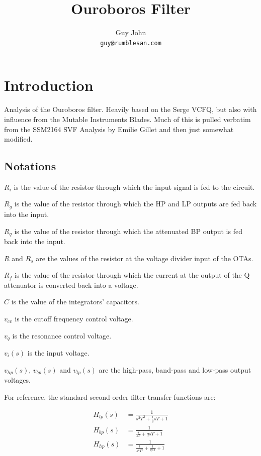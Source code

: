 \documentclass{article}
\title{Ouroboros Filter}
\author{Guy John \\ \texttt{guy@rumblesan.com}}
\begin{document}
\maketitle

\section{Introduction}
Analysis of the Ouroboros filter. Heavily based on the Serge VCFQ, but also with influence from the Mutable Instruments Blades. Much of this is pulled verbatim from the SSM2164 SVF Analysis by Emilie Gillet and then just somewhat modified.

\newpage

\subsection{Notations}

\begin{description}
\item $R_i$ is the value of the resistor through which the input signal is fed to the circuit.
\item $R_g$ is the value of the resistor through which the HP and LP outputs are fed back into the input.
\item $R_q$ is the value of the resistor through which the attenuated BP output is fed back into the input.
\item $R$ and $R_s$ are the values of the resistor at the voltage divider input of the OTAs.
\item $R_f$ is the value of the resistor through which the current at the output of the Q attenuator is converted back
into a voltage.
\item $C$ is the value of the integrators' capacitors.
\item $v_{cv}$ is the cutoff frequency control voltage.
\item $v_q$ is the resonance control voltage.
\item $v_i(s)$ is the input voltage.
\item $v_{hp}(s)$, $v_{bp}(s)$ and $v_{lp}(s)$ are the high-pass, band-pass and low-pass output voltages.
\end{description}

For reference, the standard second-order filter transfer functions are:

\begin{equation*}
\begin{split}
  H_{lp}(s) & = \frac{1}{s^2T^2 + \frac{1}{q}sT + 1} \\
  H_{bp}(s) & = \frac{1}{\frac{q}{sT} + qsT + 1} \\
  H_{hp}(s) & = \frac{1}{\frac{1}{s^2T^2} + \frac{1}{qsT} + 1} \\
\end{split}
\end{equation*}
\end{document}
